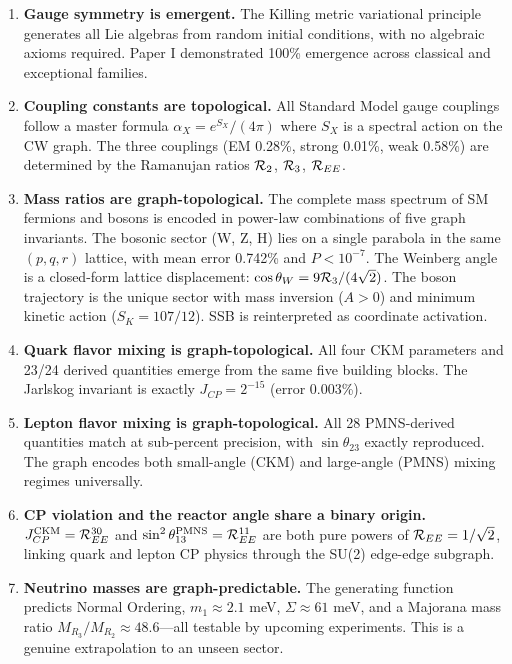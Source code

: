 \begin{enumerate}
\item \textbf{Gauge symmetry is emergent.} The Killing metric variational principle generates all Lie algebras from random initial conditions, with no algebraic axioms required. Paper I demonstrated 100\% emergence across classical and exceptional families.

\item \textbf{Coupling constants are topological.} All Standard Model gauge couplings follow a master formula $\alpha_X = e^{S_X}/(4\pi)$ where $S_X$ is a spectral action on the CW graph. The three couplings (EM 0.28\%, strong 0.01\%, weak 0.58\%) are determined by the Ramanujan ratios $\mathcal{R}_2$, $\mathcal{R}_3$, $\mathcal{R}_{EE}$.

\item \textbf{Mass ratios are graph-topological.} The complete mass spectrum of SM fermions and bosons is encoded in power-law combinations of five graph invariants. The bosonic sector (W, Z, H) lies on a single parabola in the same $(p, q, r)$ lattice, with mean error 0.742\% and $P < 10^{-7}$. The Weinberg angle is a closed-form lattice displacement: $\cos\theta_W = 9\mathcal{R}_3/(4\sqrt{2})$. The boson trajectory is the unique sector with mass inversion ($A > 0$) and minimum kinetic action ($S_K = 107/12$). SSB is reinterpreted as coordinate activation.

\item \textbf{Quark flavor mixing is graph-topological.} All four CKM parameters and 23/24 derived quantities emerge from the same five building blocks. The Jarlskog invariant is exactly $J_{CP} = 2^{-15}$ (error 0.003\%).

\item \textbf{Lepton flavor mixing is graph-topological.} All 28 PMNS-derived quantities match at sub-percent precision, with $\sin\theta_{23}$ exactly reproduced. The graph encodes both small-angle (CKM) and large-angle (PMNS) mixing regimes universally.

\item \textbf{CP violation and the reactor angle share a binary origin.} $J_{CP}^{\mathrm{CKM}} = \mathcal{R}_{EE}^{30}$ and $\sin^2\theta_{13}^{\mathrm{PMNS}} = \mathcal{R}_{EE}^{11}$ are both pure powers of $\mathcal{R}_{EE} = 1/\sqrt{2}$, linking quark and lepton CP physics through the SU(2) edge-edge subgraph.

\item \textbf{Neutrino masses are graph-predictable.} The generating function predicts Normal Ordering, $m_1 \approx 2.1$ meV, $\Sigma \approx 61$ meV, and a Majorana mass ratio $M_{R_3}/M_{R_2} \approx 48.6$---all testable by upcoming experiments. This is a genuine extrapolation to an unseen sector.


\end{enumerate}
